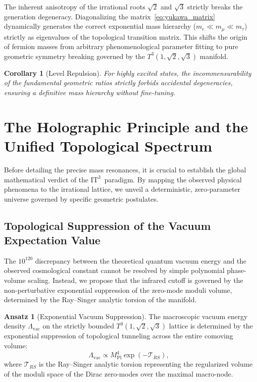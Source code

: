 \documentclass[onecolumn,aps,prd,superscriptaddress,nofootinbib,amsmath,amssymb]{revtex4-2}
\newtheorem{corollary}[theorem]{Corollary}
\theoremstyle{definition}
\newtheorem{ansatz}[theorem]{Ansatz}
\theoremstyle{remark}
\newcommand{\ITthree}{\ensuremath{\mathrm{IT}^3}}
\newcommand{\Tthree}{T^3(1,\sqrt{2},\sqrt{3})}
\begin{document}
The inherent anisotropy of the irrational roots $\sqrt{2}$ and $\sqrt{3}$ strictly breaks the generation degeneracy. Diagonalizing the matrix~\eqref{eq:yukawa_matrix} dynamically generates the correct exponential mass hierarchy ($m_e \ll m_\mu \ll m_\tau$) strictly as eigenvalues of the topological transition matrix. This shifts the origin of fermion masses from arbitrary phenomenological parameter fitting to pure geometric symmetry breaking governed by the $\Tthree$ manifold.

\begin{corollary}[Level Repulsion]
For highly excited states, the incommensurability of the fundamental geometric ratios strictly forbids accidental degeneracies, ensuring a definitive mass hierarchy without fine-tuning.
\end{corollary}

\section{The Holographic Principle and the Unified Topological Spectrum}
\label{sec:holographic}

Before detailing the precise mass resonances, it is crucial to establish the global mathematical verdict of the \ITthree\ paradigm. By mapping the observed physical phenomena to the irrational lattice, we unveil a deterministic, zero-parameter universe governed by specific geometric postulates.

\subsection{Topological Suppression of the Vacuum Expectation Value}
\label{subsec:vacuum_suppression}

The $10^{120}$ discrepancy between the theoretical quantum vacuum energy and the observed cosmological constant cannot be resolved by simple polynomial phase-volume scaling. Instead, we propose that the infrared cutoff is governed by the non-perturbative exponential suppression of the zero-mode moduli volume, determined by the Ray--Singer analytic torsion of the manifold.

\begin{ansatz}[Exponential Vacuum Suppression]
\label{ansatz:vacuum}
The macroscopic vacuum energy density $\Lambda_{\text{vac}}$ on the strictly bounded $\Tthree$ lattice is determined by the exponential suppression of topological tunneling across the entire comoving volume:
\begin{equation}
\Lambda_{\text{vac}} \propto M_{\text{Pl}}^4 \exp(-\mathcal{T}_{RS}),
\label{eq:vacuum_exp}
\end{equation}
where $\mathcal{T}_{RS}$ is the Ray--Singer analytic torsion representing the regularized volume of the moduli space of the Dirac zero-modes over the maximal macro-node.
\end{ansatz}
\end{document}
